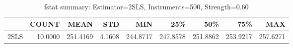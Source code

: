 \begin{table}[ht]
\centering
\caption{fstat summary: Estimator=2SLS, Instruments=500, Strength=0.60}
\begin{tabular}{lrrrrrrrr}
\toprule
 & COUNT & MEAN & STD & MIN & 25\% & 50\% & 75\% & MAX \\
\midrule
2SLS & 10.0000 & 251.4169 & 4.1608 & 244.8717 & 247.8578 & 251.8862 & 253.9217 & 257.6271 \\
\bottomrule
\end{tabular}
\end{table}
